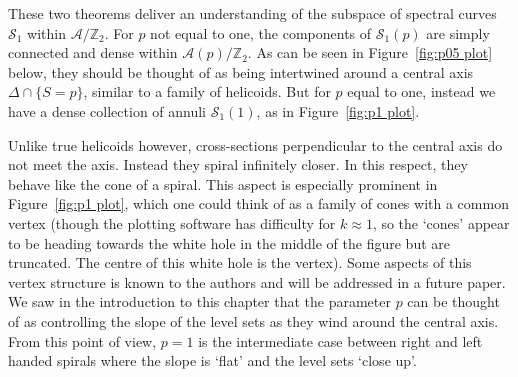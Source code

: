 \documentclass{article}
\begin{document}
These two theorems deliver an understanding of the subspace of spectral curves $\mathcal{S}_1$ within $\mathcal{A}/\mathbb{Z}_2$. 
For $p$ not equal to one, the components of $\mathcal{S}_1(p)$ are simply connected and dense within $\mathcal{A}(p)/\mathbb{Z}_2$. As can be seen in Figure~\ref{fig:p05 plot} below, they should be thought of as being intertwined around a central axis $\Delta\cap\{S=p\}$, similar to a family of helicoids. But for $p$ equal to one, instead we have a dense collection of annuli $\mathcal{S}_1(1)$, as in Figure~\ref{fig:p1 plot}.

Unlike true helicoids however, cross-sections perpendicular to the central axis do not meet the axis. Instead they spiral infinitely closer. In this respect, they behave like the cone of a spiral. This aspect is especially prominent in Figure~\ref{fig:p1 plot}, which one could think of as a family of cones with a common vertex (though the plotting software has difficulty for $k\approx 1$, so the `cones' appear to be heading towards the white hole in the middle of the figure but are truncated. The centre of this white hole is the vertex). Some aspects of this vertex structure is known to the authors and will be addressed in a future paper.
We saw in the introduction to this chapter that the parameter $p$ can be thought of as controlling the slope of the level sets as they wind around the central axis. From this point of view, $p=1$ is the intermediate case between right and left handed spirals where the slope is `flat' and the level sets `close up'.
\end{document}
